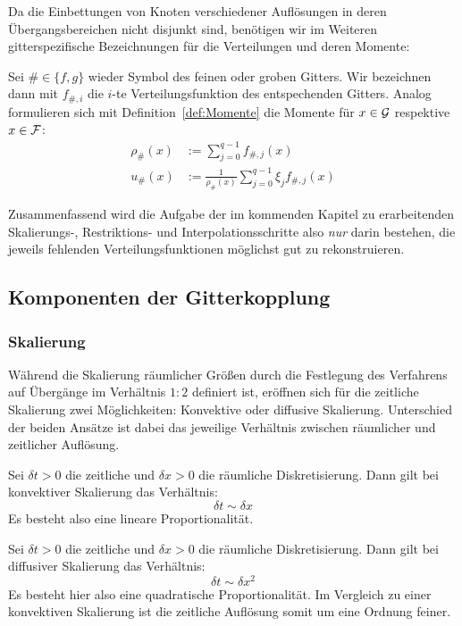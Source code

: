 Da die Einbettungen von Knoten verschiedener Auflösungen in deren Übergangsbereichen nicht disjunkt sind, benötigen wir im Weiteren gitterspezifische Bezeichnungen für die Verteilungen und deren Momente:

\begin{Definition}
Sei \(\# \in \{f, g\}\) wieder Symbol des feinen oder groben Gitters. Wir bezeichnen dann mit \(f_{\#,i}\) die \(i\)-te Verteilungsfunktion des entspechenden Gitters. Analog formulieren sich mit Definition~\ref{def:Momente} die Momente für \(x \in \mathcal{G}\) respektive \(x \in \mathcal{F}\):
\begin{align*}
\rho_\#(x) &:= \sum_{j=0}^{q-1} f_{\#,j}(x) \\
u_\#(x) &:= \frac{1}{\rho_\#(x)} \sum_{j=0}^{q-1} \xi_j f_{\#,j}(x)
\end{align*}
\end{Definition}

\bigskip
Zusammenfassend wird die Aufgabe der im kommenden Kapitel zu erarbeitenden Skalierungs-, Restriktions- und Interpolationsschritte also \emph{nur} darin bestehen, die jeweils fehlenden Verteilungsfunktionen möglichst gut zu rekonstruieren.

\newpage
\subsection{Komponenten der Gitterkopplung}
\subsubsection{Skalierung}\label{kap:Skalierung}

Während die Skalierung räumlicher Größen durch die Festlegung des Verfahrens auf Übergänge im Verhältnis \(1:2\) definiert ist, eröffnen sich für die zeitliche Skalierung zwei Möglichkeiten: Konvektive oder diffusive Skalierung. Unterschied der beiden Ansätze ist dabei das jeweilige Verhältnis zwischen räumlicher und zeitlicher Auflösung.

\begin{Definition}
Sei \(\delta t > 0\) die zeitliche und \(\delta x > 0\) die räumliche Diskretisierung. Dann gilt bei konvektiver Skalierung das Verhältnis:
\[ \delta t \sim \delta x \]
Es besteht also eine lineare Proportionalität.
\end{Definition}

\begin{Definition}
Sei \(\delta t > 0\) die zeitliche und \(\delta x > 0\) die räumliche Diskretisierung. Dann gilt bei diffusiver Skalierung das Verhältnis:
\[ \delta t \sim \delta x^2 \]
Es besteht hier also eine quadratische Proportionalität. Im Vergleich zu einer konvektiven Skalierung ist die zeitliche Auflösung somit um eine Ordnung feiner.
\end{Definition}

